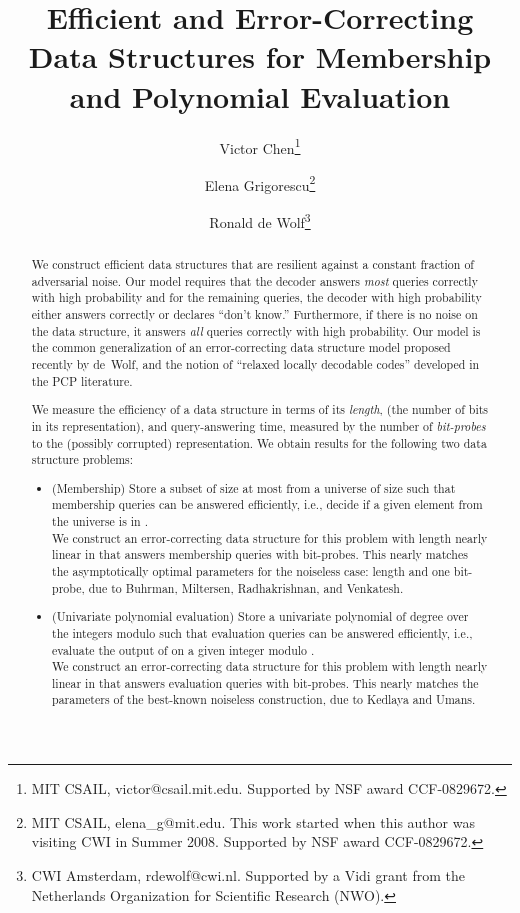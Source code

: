 \documentclass[11pt,english]{article}
\date{}
\theoremstyle{definition}
\theoremstyle{remark}
\begin{document}
\title{Efficient and Error-Correcting Data Structures for Membership and
Polynomial Evaluation}


\author{Victor Chen\thanks{MIT CSAIL, victor@csail.mit.edu. Supported by NSF award CCF-0829672. } \and Elena Grigorescu\thanks{MIT CSAIL, elena\_g@mit.edu. This work started when this author was
visiting CWI in Summer 2008. Supported by NSF award CCF-0829672. } \and Ronald de Wolf\thanks{CWI Amsterdam, rdewolf@cwi.nl. Supported by a Vidi grant
from the Netherlands Organization for Scientific Research (NWO).
}}


\maketitle
\setcounter{page}{0} 
\begin{abstract}
We construct efficient data structures that are resilient against
a constant fraction of adversarial noise. Our model requires that
the decoder answers \emph{most} queries correctly with high probability
and for the remaining queries, the decoder with high probability either
answers correctly or declares ``don't know.'' Furthermore, if
there is no noise on the data structure, it answers \emph{all} queries
correctly with high probability. Our model is the common generalization
of an error-correcting data structure model proposed recently by de~Wolf, 
and the notion of ``relaxed locally decodable codes'' developed in the PCP literature.

We measure the efficiency of a data structure in terms of its \emph{length},
(the number of bits in its representation), and query-answering
time, measured by the number of \emph{bit-probes} to the (possibly corrupted)
representation. We obtain results for the following two data structure problems: 
\begin{itemize}
\item (Membership) Store a subset  of size at most  from a universe
of size  such that membership queries can be answered efficiently,
i.e., decide if a given element from the universe is in . \\
 We construct an error-correcting data structure for this problem
with length nearly linear in  that answers membership queries
with  bit-probes. This nearly matches the asymptotically optimal
parameters for the noiseless case: length  and one bit-probe,
due to Buhrman, Miltersen, Radhakrishnan, and Venkatesh. 
\item (Univariate polynomial evaluation) Store a univariate polynomial 
of degree  over the integers modulo  such that
evaluation queries can be answered efficiently, i.e., evaluate the
output of  on a given integer modulo . \\
 We construct an error-correcting data structure for this problem
with length nearly linear in  that answers evaluation queries
with  bit-probes. This nearly matches
the parameters of the best-known noiseless construction, due to Kedlaya
and Umans.
\end{itemize}

\end{abstract}
\thispagestyle{empty} \newpage{}
\end{document}
